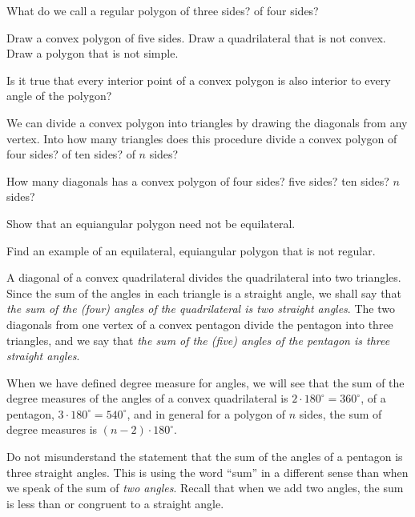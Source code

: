 \documentclass[11pt]{book}
\begin{document}
\begin{exercisecols}
\begin{exlist}
\item What do we call a regular polygon of three sides? of four sides?
\item Draw a convex polygon of five sides. Draw a quadrilateral that is not
  convex. Draw a polygon that is not simple.
\item[\stex 3.] Is it true that every interior point of a convex polygon is
  also interior to every angle of the polygon?
\item[4.] We can divide a convex polygon into triangles by drawing the
  diagonals from any vertex. Into how many triangles does this procedure
  divide a convex polygon of four sides? of ten sides? of $n$ sides?
\item[\stex 5.] How many diagonals has a convex polygon of four sides? five
  sides? ten sides? $n$ sides?
\item[6.] Show that an equiangular polygon need not be equilateral.
\item[\stex 7.] Find an example of an equilateral, equiangular polygon that is
  not regular.
\end{exlist}
\end{exercisecols}

A diagonal of a convex quadrilateral divides the quadrilateral into two
triangles. Since the sum of the angles in each triangle is a straight angle,
we shall say that \emph{the sum of the (four) angles of the quadrilateral is
two straight angles}. The two diagonals from one vertex of a convex pentagon
divide the pentagon into three triangles, and we say that \emph{the sum of the
(five) angles of the pentagon is three straight angles}.

When we have defined degree measure for angles, we will see that the sum of
the degree measures of the angles of a convex quadrilateral is
$2 \cdot 180^\circ = 360^\circ$, of a pentagon,
$3 \cdot 180^\circ = 540^\circ$, and in general for a polygon of $n$ sides,
the sum of degree measures is $(n - 2) \cdot 180^\circ$.

Do not misunderstand the statement that the sum of the angles of a pentagon is
three straight angles. This is using the word ``sum'' in a different sense
than when we speak of the sum of \emph{two angles}. Recall that when we add
two angles, the sum is less than or congruent to a straight angle.

\FIGVIIITWENTYTWOTHREE
\end{document}
